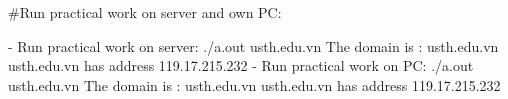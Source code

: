 \documentclass[12pt]{article}
\begin{document}
#Run practical work on server and own PC:

- Run practical work on server:
./a.out usth.edu.vn
The domain is : usth.edu.vn
usth.edu.vn has address 119.17.215.232
- Run practical work on PC:
./a.out usth.edu.vn
The domain is : usth.edu.vn
usth.edu.vn has address 119.17.215.232
\end{document}
